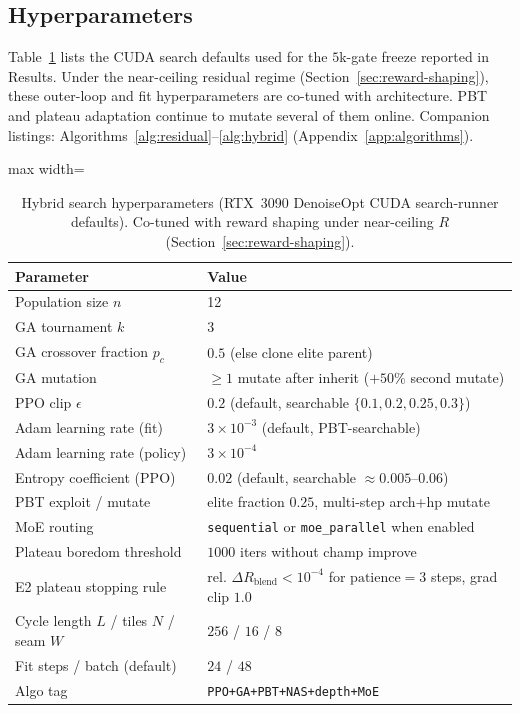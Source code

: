 \subsection{Hyperparameters}
\label{sec:hyperparams}

Table~\ref{tab:hyperparams} lists the CUDA search defaults used for the $5$k-gate freeze reported in Results.
Under the near-ceiling residual regime (Section~\ref{sec:reward-shaping}), these outer-loop and fit hyperparameters are co-tuned with architecture. PBT and plateau adaptation continue to mutate several of them online.
Companion listings: Algorithms~\ref{alg:residual}--\ref{alg:hybrid} (Appendix~\ref{app:algorithms}).

\begin{table}[t]
  \centering
  \small
  \caption{Hybrid search hyperparameters (RTX~3090 DenoiseOpt CUDA search-runner defaults). Co-tuned with reward shaping under near-ceiling $R$ (Section~\ref{sec:reward-shaping}).}
  \label{tab:hyperparams}
  \setlength{\tabcolsep}{3pt}
  \begin{adjustbox}{max width=\columnwidth}
\begin{tabular}{@{}lp{}@{}}
    \toprule
    Parameter & Value \\
    \midrule
    Population size $n$ & 12 \\
    GA tournament $k$ & 3 \\
    GA crossover fraction $p_c$ & $0.5$ (else clone elite parent) \\
    GA mutation & $\ge 1$ mutate after inherit ($+50\%$ second mutate) \\
    PPO clip $\epsilon$ & $0.2$ (default, searchable $\{0.1,0.2,0.25,0.3\}$) \\
    Adam learning rate (fit) & $3{\times}10^{-3}$ (default, PBT-searchable) \\
    Adam learning rate (policy) & $3{\times}10^{-4}$ \\
    Entropy coefficient (PPO) & $0.02$ (default, searchable $\approx 0.005$--$0.06$) \\
    PBT exploit / mutate & elite fraction $0.25$, multi-step arch+hp mutate \\
    MoE routing & \texttt{sequential} or \texttt{moe\_parallel} when enabled \\
    Plateau boredom threshold & $1000$ iters without champ improve \\
    E2 plateau stopping rule & $\text{rel.\ }\Delta R_{\mathrm{blend}}<10^{-4}$ for $\text{patience}{=}3$ steps, grad clip $1.0$ \\
    Cycle length $L$ / tiles $N$ / seam $W$ & $256$ / $16$ / $8$ \\
    Fit steps / batch (default) & $24$ / $48$ \\
    Algo tag & \texttt{PPO+GA+PBT+NAS+depth+MoE} \\
    \bottomrule
  \end{tabular}
\end{adjustbox}
\end{table}
